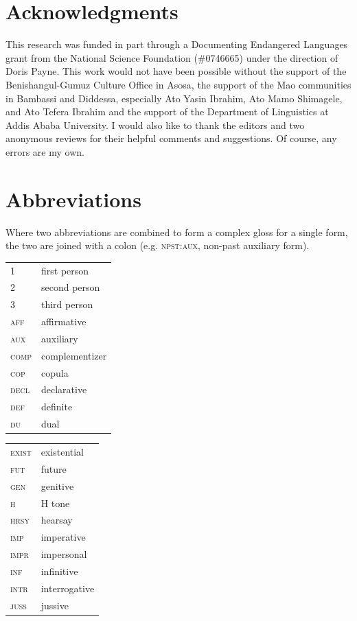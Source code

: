 \documentclass[output=paper]{langsci/langscibook}
\begin{document}
\section*{\textbf{Acknowledgments}}

This research was funded in part through a Documenting Endangered Languages grant from the National Science Foundation (\#0746665) under the direction of Doris Payne. This work would not have been possible without the support of the Benishangul-Gumuz Culture Office in Asosa, the support of the Mao communities in Bambassi and Diddessa, especially Ato Yasin Ibrahim, Ato Mamo Shimagele, and Ato Tefera Ibrahim and the support of the Department of Linguistics at Addis Ababa University. I would also like to thank the editors and two anonymous reviews for their helpful comments and suggestions. Of course, any errors are my own. 

\section*{\textbf{Abbreviations}}

Where two abbreviations are combined to form a complex gloss for a single form, the two are joined with a colon (e.g. \textsc{npst:aux}, non-past auxiliary form). 
\bigskip


\begin{tabularx}{.45\textwidth}{lX} 
1 & first person\\
2 & second person\\
3 & third person\\
\textsc{aff}     & affirmative\\
\textsc{aux}     & auxiliary\\
\textsc{comp}     & complementizer\\
\textsc{cop}     & copula\\
\textsc{decl}     & declarative\\
\textsc{def}     & definite\\
\textsc{du}     & dual\\
\end{tabularx}
\begin{tabularx}{.45\textwidth}{lX} 
\textsc{exist}     & existential \\
\textsc{fut}     & future \\
\textsc{gen}     & genitive\\
\textsc{h}     & H tone\\
\textsc{hrsy}     & hearsay\\
\textsc{imp}     & imperative\\
\textsc{impr}     & impersonal\\
\textsc{inf}     & infinitive\\
\textsc{intr}     & interrogative\\
\textsc{juss}     & jussive\\
\end{tabularx}
\end{document}
